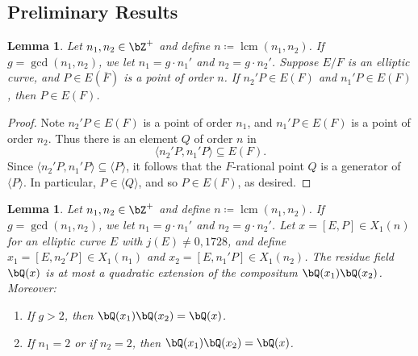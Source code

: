 \documentclass[11pt,reqno]{amsart}
\theoremstyle{plain}
\newtheorem{lemma}[theorem]{Lemma}
\theoremstyle{definition}
\DeclareMathOperator{\lcm}{lcm}
\newcommand{\Q}{\bQ}
\newcommand{\Z}{\bZ}
\begin{document}
\subsection{Preliminary Results}

\begin{lemma}\label{lem:LCM}
Let $n_1,n_2 \in \Z^+$ and define $n \coloneqq \lcm(n_1,n_2)$. If $g=\gcd(n_1,n_2)$, we let $n_1=g\cdot n_1'$ and $n_2=g\cdot n_2'$. Suppose $E/F$ is an elliptic curve, and $P \in E(\overline{F})$ is a point of order $n$. If $n_2'P\in E(F)$ and $n_1'P \in E(F)$, then $P \in E(F)$.
\end{lemma}

\begin{proof}
Note $n_2'P \in E(F)$ is a point of order $n_1$, and $n_1'P \in E(F)$ is a point of order $n_2$.  Thus there is an element $Q$ of order $n$ in
\[
\langle n_2'P, n_1' P \rangle \subseteq E(F).
\] Since $\langle n_2'P, n_1' P \rangle \subseteq \langle P \rangle$, it follows that the $F$-rational point $Q$ is a generator of $\langle P \rangle$. In particular, $P\in \langle Q \rangle$, and so $P\in E(F)$, as desired.
\end{proof}

\begin{lemma} \label{lem:compositum_res_fields}
Let $n_1,n_2 \in \Z^+$ and define $n \coloneqq \lcm(n_1,n_2)$. If $g=\gcd(n_1,n_2)$, we let $n_1=g\cdot n_1'$ and $n_2=g\cdot n_2'$. Let $x=[E,P] \in X_1(n)$ for an elliptic curve $E$ with $j(E) \neq 0,1728$, and define $x_1=[E,n_2'P] \in X_1(n_1)$ and $x_2=[E,n_1'P] \in X_1(n_2)$. The residue field $\Q(x)$ is at most a quadratic extension of the compositum $\Q(x_1)\Q(x_2)$. Moreover:
\begin{enumerate}
\item If $g>2$, then $\Q(x_1)\Q(x_2)=\Q(x)$.
\item If $n_1=2$ or if $n_2=2$, then $\Q(x_1)\Q(x_2)=\Q(x)$.
\end{enumerate}
\end{lemma}
\end{document}

